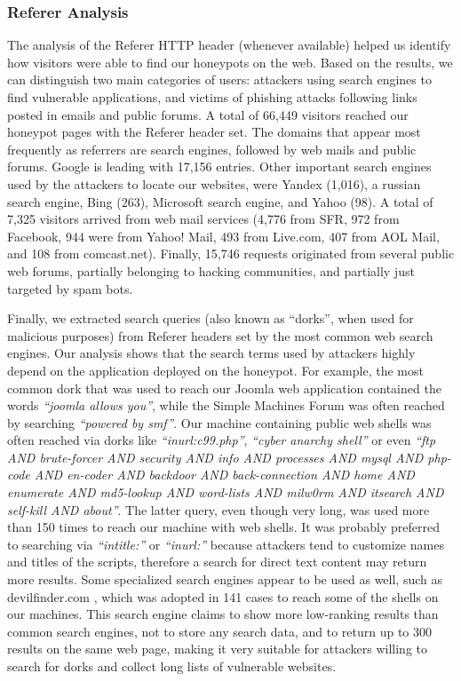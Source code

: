 \subsubsection{Referer Analysis}

The analysis of the Referer HTTP header (whenever available) helped us identify how visitors were able to find our honeypots on the web. Based on the results, we can distinguish two main categories of users: attackers using search engines to find vulnerable applications, and victims of phishing attacks following links posted in emails and public forums.
A total of 66,449 visitors reached our honeypot pages with the Referer header set. The domains that appear most frequently as referrers are search engines, followed by web mails and public forums. Google is leading with 17,156 entries. Other important search engines used by the attackers to locate our websites, were Yandex (1,016), a russian search engine, Bing (263), Microsoft search engine, and Yahoo (98). A total of 7,325 visitors arrived from web mail services (4,776 from SFR, 972 from Facebook, 944 were from Yahoo! Mail, 493 from Live.com, 407 from AOL Mail, and 108 from comcast.net). Finally, 15,746 requests originated from several public web forums, partially belonging to hacking communities, and partially just targeted by spam bots.

Finally, we extracted search queries (also known as ``dorks'', when used for malicious purposes) from Referer headers set by the most common web search engines. Our analysis shows that the search terms used by attackers highly depend on the application deployed on the honeypot. For example, the most common dork that was used to reach our Joomla web application contained the words \emph{``joomla allows you''}, while the Simple Machines Forum was often reached by searching \emph{``powered by smf''}. Our machine containing public web shells was often reached via dorks like \emph{``inurl:c99.php''}, \emph{``cyber anarchy shell''} or even \emph{``ftp AND brute-forcer AND security AND info AND processes AND mysql AND php-code AND en-coder AND backdoor AND back-connection AND home AND enumerate AND md5-lookup AND word-lists AND milw0rm AND itsearch AND self-kill AND about''}. The latter query, even though very long, was used more than 150 times to reach our machine with web shells. It was probably preferred to searching via \emph{``intitle:''} or \emph{``inurl:''} because attackers tend to customize names and titles of the scripts, therefore a search for direct text content may return more results. Some specialized search engines appear to be used as well, such as devilfinder.com \cite{devilfinder}, which was adopted in 141 cases to reach some of the shells on our machines. This search engine claims to show more low-ranking results than common search engines, not to store any search data, and to return up to 300 results on the same web page, making it very suitable for attackers willing to search for dorks and collect long lists of vulnerable websites.

